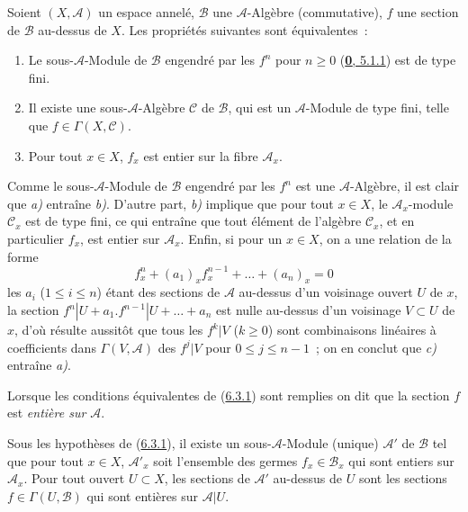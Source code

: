 \begin{proposition}[6.3.1]
\label{II.6.3.1-fr}
Soient $(X,\mathcal{A})$ un espace annelé, $\mathcal{B}$ une
$\mathcal{A}$-Algèbre (commutative), $f$ une section de $\mathcal{B}$
au-dessus de $X$. Les propriétés suivantes sont équivalentes~:
\begin{enumerate}
\item[\textup{a)}] Le sous-$\mathcal{A}$-Module de $\mathcal{B}$ engendré par les
$f^n$ pour $n\geq 0$ \textup{(\hyperref[0.5.1.1-fr]{\textbf{0}, 5.1.1})} est de type fini.
\item[\textup{b)}] Il existe une sous-$\mathcal{A}$-Algèbre $\mathcal{C}$ de
$\mathcal{B}$, qui est un $\mathcal{A}$-Module de type fini, telle que
$f\in\Gamma(X,\mathcal{C})$.
\item[\textup{c)}] Pour tout $x\in X$, $f_x$ est entier sur la fibre
$\mathcal{A}_x$.
\end{enumerate}
\end{proposition}


Comme le sous-$\mathcal{A}$-Module de $\mathcal{B}$ engendré par les $f^n$ est
une $\mathcal{A}$-Algèbre, il est clair que \emph{a)} entraîne \emph{b)}. D'autre part, \emph{b)}
implique que pour tout $x\in X$, le $\mathcal{A}_x$-module $\mathcal{C}_x$ est
de type fini, ce qui entraîne que tout élément de l'algèbre $\mathcal{C}_x$, et
en particulier $f_x$, est entier sur $\mathcal{A}_x$. Enfin, si pour un
$x\in X$, on a une relation de la forme
\[
f_x^n+(a_1)_xf_x^{n-1}+\ldots+(a_n)_x=0
\]
les $a_i$ ($1\leq i\leq n$) étant des sections de $\mathcal{A}$ au-dessus
d'un voisinage ouvert $U$ de $x$, la section
$f^n|U+a_1.f^{n-1}|U+\ldots+a_n$ est nulle au-dessus d'un voisinage
$V\subset U$ de $x$, d'où résulte aussitôt que tous les $f^k|V$ ($k\geq0$)
sont combinaisons linéaires à coefficients dans $\Gamma(V,\mathcal{A})$ des
$f^j|V$ pour $0\leq j\leq n-1$~; on en conclut que \emph{c)} entraîne \emph{a)}.

Lorsque les conditions équivalentes de (\hyperref[II.6.3.1-fr]{6.3.1}) sont
remplies on dit que la section $f$ est \emph{entière sur $\mathcal{A}$}.

\begin{corollary}[6.3.2]
\label{II.6.3.2-fr}
Sous les hypothèses de \textup{(\hyperref[II.6.3.1-fr]{6.3.1})}, il existe un
sous-$\mathcal{A}$-Module (unique) $\mathcal{A}'$ de $\mathcal{B}$ tel que pour
tout $x\in X$, $\mathcal{A}'_x$ soit l'ensemble des germes
$f_x\in\mathcal{B}_x$ qui sont entiers sur $\mathcal{A}_x$. Pour tout ouvert
$U\subset X$, les sections de $\mathcal{A}'$ au-dessus de $U$ sont les
sections $f\in\Gamma(U,\mathcal{B})$ qui sont entières sur
$\mathcal{A}|U$.
\end{corollary}

